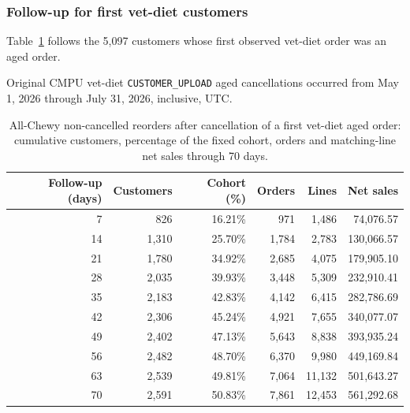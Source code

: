 \clearpage
\subsubsection{Follow-up for first vet-diet customers}
Table~\ref{tab:financial-opportunity-new-vet-diet-all-chewy} follows the
5,097 customers whose first observed vet-diet order was an aged order.

Original CMPU vet-diet
\texttt{CUSTOMER\_UPLOAD} aged cancellations occurred from
May 1, 2026 through July 31, 2026, inclusive, UTC.

\begin{table}[!htbp]
\centering
\caption{All-Chewy non-cancelled reorders after cancellation of a first vet-diet aged order: cumulative customers, percentage of the fixed cohort, orders and matching-line net sales through 70 days.}
\label{tab:financial-opportunity-new-vet-diet-all-chewy}
\begin{tabular}{@{}rrrrrr@{}}
\toprule
Follow-up (days) & Customers & Cohort (\%) & Orders & Lines & Net sales \\
\midrule
7 & 826 & 16.21\% & 971 & 1,486 & 74,076.57 \\
14 & 1,310 & 25.70\% & 1,784 & 2,783 & 130,066.57 \\
21 & 1,780 & 34.92\% & 2,685 & 4,075 & 179,905.10 \\
28 & 2,035 & 39.93\% & 3,448 & 5,309 & 232,910.41 \\
35 & 2,183 & 42.83\% & 4,142 & 6,415 & 282,786.69 \\
42 & 2,306 & 45.24\% & 4,921 & 7,655 & 340,077.07 \\
49 & 2,402 & 47.13\% & 5,643 & 8,838 & 393,935.24 \\
56 & 2,482 & 48.70\% & 6,370 & 9,980 & 449,169.84 \\
63 & 2,539 & 49.81\% & 7,064 & 11,132 & 501,643.27 \\
70 & 2,591 & 50.83\% & 7,861 & 12,453 & 561,292.68 \\
\bottomrule
\end{tabular}


\end{table}
